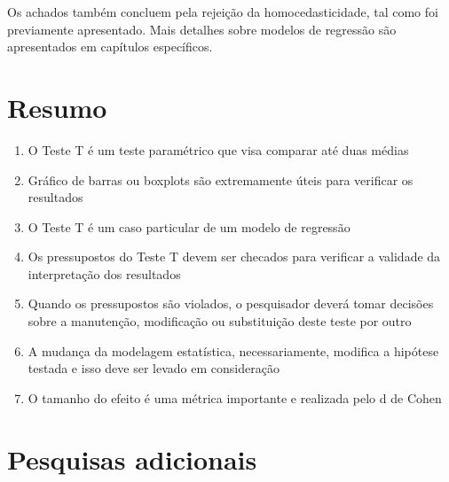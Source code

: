 \documentclass[
]{book}
\providecommand{\tightlist}{%
  \setlength{\itemsep}{0pt}\setlength{\parskip}{0pt}}
\begin{document}
Os achados também concluem pela rejeição da homocedasticidade, tal como foi previamente apresentado. Mais detalhes sobre modelos de regressão são apresentados em capítulos específicos.

\hypertarget{resumo-5}{%
\section{Resumo}\label{resumo-5}}

\begin{explore}

\begin{enumerate}
\def\labelenumi{\arabic{enumi}.}
\tightlist
\item
  O Teste T é um teste paramétrico que visa comparar até duas médias\\
\item
  Gráfico de barras ou boxplots são extremamente úteis para verificar os resultados\\
\item
  O Teste T é um caso particular de um modelo de regressão\\
\item
  Os pressupostos do Teste T devem ser checados para verificar a validade da interpretação dos resultados\\
\item
  Quando os pressupostos são violados, o pesquisador deverá tomar decisões sobre a manutenção, modificação ou substituição deste teste por outro\\
\item
  A mudança da modelagem estatística, necessariamente, modifica a hipótese testada e isso deve ser levado em consideração\\
\item
  O tamanho do efeito é uma métrica importante e realizada pelo d de Cohen\\
\end{enumerate}

\end{explore}

\hypertarget{pesquisas-adicionais-2}{%
\section{Pesquisas adicionais}\label{pesquisas-adicionais-2}}
\end{document}
